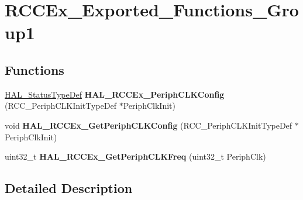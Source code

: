 \hypertarget{group___r_c_c_ex___exported___functions___group1}{}\section{R\+C\+C\+Ex\+\_\+\+Exported\+\_\+\+Functions\+\_\+\+Group1}
\label{group___r_c_c_ex___exported___functions___group1}
\subsection*{Functions}
\begin{DoxyCompactItemize}
\item 
\mbox{\label{group___r_c_c_ex___exported___functions___group1_ga0c0f61a1e2f47cc81bc43d83ba3e0d95}} 
\hyperlink{stm32f0xx__hal__def_8h_a63c0679d1cb8b8c684fbb0632743478f}{H\+A\+L\+\_\+\+Status\+Type\+Def} {\bfseries H\+A\+L\+\_\+\+R\+C\+C\+Ex\+\_\+\+Periph\+C\+L\+K\+Config} (R\+C\+C\+\_\+\+Periph\+C\+L\+K\+Init\+Type\+Def $\ast$Periph\+Clk\+Init)
\item 
\mbox{\label{group___r_c_c_ex___exported___functions___group1_ga754fc5136c63ad52b7c459aafc8a3927}} 
void {\bfseries H\+A\+L\+\_\+\+R\+C\+C\+Ex\+\_\+\+Get\+Periph\+C\+L\+K\+Config} (R\+C\+C\+\_\+\+Periph\+C\+L\+K\+Init\+Type\+Def $\ast$Periph\+Clk\+Init)
\item 
\mbox{\label{group___r_c_c_ex___exported___functions___group1_ga14acaeb88163a6bb0839470b753ba1bd}} 
uint32\+\_\+t {\bfseries H\+A\+L\+\_\+\+R\+C\+C\+Ex\+\_\+\+Get\+Periph\+C\+L\+K\+Freq} (uint32\+\_\+t Periph\+Clk)
\end{DoxyCompactItemize}


\subsection{Detailed Description}

